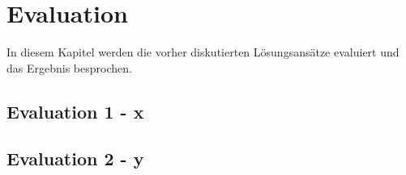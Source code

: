 
\section{Evaluation}
\label{sec:evaluation}

In diesem Kapitel werden die vorher diskutierten Lösungsansätze evaluiert und das Ergebnis besprochen.

\subsection{Evaluation 1 - x}

\subsection{Evaluation 2 - y}